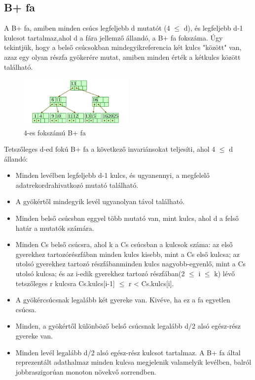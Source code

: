 \documentclass[margin=0px]{article}
\begin{document}
\subsection{B+ fa}
A B+ fa, amiben minden csúcs legfeljebb d mutatót (4 $\leq$  d), és legfeljebb d-1 kulcsot tartalmaz,ahol d a fára jellemző állandó, a B+ fa fokszáma. 
Úgy tekintjük, hogy a belső csúcsokban mindegyikreferencia
két kulcs "között" van, azaz egy olyan részfa gyökerére mutat, amiben minden érték a kétkulcs között található.

\begin{figure}[H]
    \centering
    \includegraphics[width=0.5\textwidth]{img/b_plus.png}
    \caption{4-es fokszámú B+ fa}
\end{figure}

Tetszőleges d-ed fokú B+ fa a következő invariánsokat teljesíti, ahol 4 $\leq$ d állandó:
\begin{itemize}
    \item Minden levélben legfeljebb d-1 kulcs, és ugyanennyi, a megfelelő adatrekordrahivatkozó mutató található.
    \item A gyökértől mindegyik levél ugyanolyan távol található.
    \item Minden belső csúcsban eggyel több mutató van, mint kulcs, ahol d a felső határ a mutatók számára.
    \item Minden Cs belső csúcsra, ahol k a Cs csúcsban a kulcsok száma: az első gyerekhez tartozórészfában minden kulcs kisebb, mint a Cs első kulcsa; az utolsó gyerekhez tartozó részfábanminden kulcs nagyobb-egyenlő, mint a Cs utolsó kulcsa; és az i-edik gyerekhez tartozó részfában(2 $\leq$ i $\leq$ k) lévő tetszőleges r kulcsra Cs.kulcs[i-1] $\leq$ r < Cs.kulcs[i].
    \item A gyökércsúcsnak legalább két gyereke van. Kivéve, ha ez a fa egyetlen csúcsa.
    \item Minden, a gyökértől különböző belső csúcsnak legalább d/2 alsó egész-rész gyereke van.
    \item Minden levél legalább d/2 alsó egész-rész kulcsot tartalmaz. A B+ fa által reprezentált adathalmaz minden kulcsa megjelenik valamelyik levélben, balról jobbraszigorúan monoton növekvő sorrendben.
\end{itemize}
\end{document}
